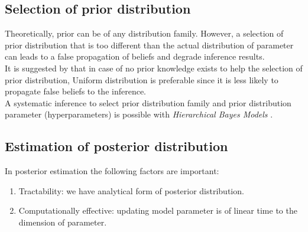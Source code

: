 \subsection{Selection of prior distribution}
Theoretically, prior can be of any distribution family. However, a selection of
prior distribution that is too different than the actual distribution of
parameter can leads to a false propagation of beliefs and degrade inference
results.\\
It is suggested by \cite{polgreen2016data} that in case of no prior knowledge
exists to help the selection of prior distribution, Uniform distribution is
preferable since it is less likely to propagate false beliefs to the
inference.\\
A systematic inference to select prior distribution family and prior
distribution parameter (hyperparameters) is possible with \textit{Hierarchical Bayes Models} \cite{allenby2005hierarchical}.

\subsection{Estimation of posterior distribution}
In posterior estimation the following factors are important:
\begin{enumerate}
    \item Tractability: we have analytical form of posterior distribution.
    \item Computationally effective: updating model parameter is of linear time to
          the dimension of parameter.
\end{enumerate}

